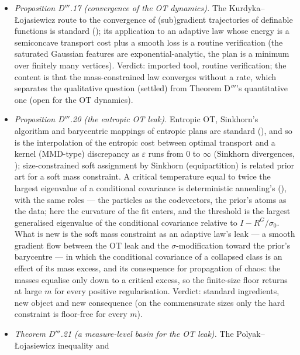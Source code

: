 \begin{itemize}
    prior (the Laguerre-cell leak) was Section~\ref{sec:program}'s open item. Numerics: .
    Verdict: textbook ingredients, new mechanism and new object (a conservation law of the leak as the source of
    the finite-size floor, broken by the plan's mass constraint).
  \item \emph{Proposition D$'''$.17 (convergence of the OT dynamics).} The Kurdyka--{\L}ojasiewicz route to the
    convergence of (sub)gradient trajectories of definable functions is standard (\cite{S43,S44}); its application to
    an adaptive law whose energy is a semiconcave transport cost plus a smooth loss is a routine verification (the
    saturated Gaussian features are exponential-analytic, the plan is a minimum over finitely many vertices).
    Verdict: imported tool, routine verification; the content is that the mass-constrained law converges without a
    rate, which separates the qualitative question (settled) from Theorem D$'''$'s quantitative one (open for the OT
    dynamics).
  \item \emph{Proposition D$'''$.20 (the entropic OT leak).} Entropic OT, Sinkhorn's algorithm and barycentric
    mappings of entropic plans are standard (\cite{S45}), and so is the interpolation of the entropic cost between
    optimal transport and a kernel (MMD-type) discrepancy as $\varepsilon$ runs from 0 to $\infty$ (Sinkhorn
    divergences, \cite{S45}); size-constrained soft assignment by Sinkhorn (equipartition) is related prior art for a
    soft mass constraint. A critical temperature equal to twice the largest eigenvalue of a conditional covariance is
    deterministic annealing's (\cite{S46}), with the same roles --- the particles as the codevectors, the prior's
    atoms as the data; here the curvature of the fit enters, and the threshold is the largest generalised eigenvalue
    of the conditional covariance relative to $I - R^G/\sigma_0$. What is new is the soft mass constraint as an
    adaptive law's leak --- a smooth gradient flow between the OT leak and the $\sigma$-modification toward the
    prior's barycentre --- in which the conditional covariance of a collapsed class is an effect of its mass excess,
    and its consequence for propagation of chaos: the masses equalise only down to a critical excess, so the
    finite-size floor returns at large $m$ for every positive regularisation. Verdict: standard ingredients, new
    object and new consequence (on the commensurate sizes only the hard constraint is floor-free for every $m$).
  \item \emph{Theorem D$'''$.21 (a measure-level basin for the OT leak).} The Polyak--{\L}ojasiewicz inequality and

\end{itemize}
